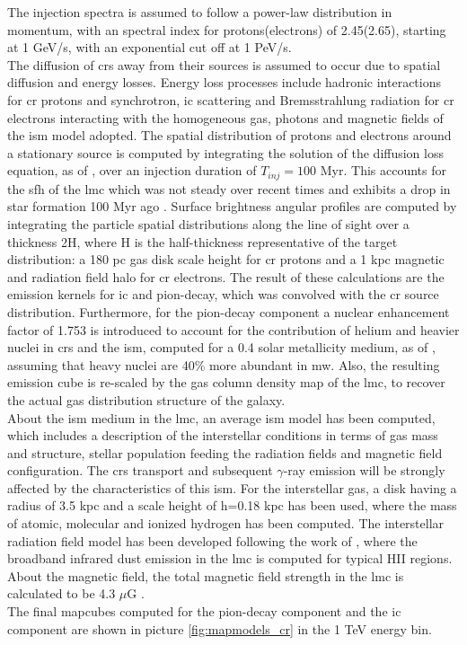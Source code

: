\documentclass[main.tex]{subfiles}
\begin{document}
The injection spectra is assumed to follow a power-law distribution in momentum, with an spectral index for protons(electrons) of 2.45(2.65), starting at 1 GeV/s, with an exponential cut off at 1 PeV/s.\\
The diffusion of \glspl{cr} away from their sources is assumed to occur due to spatial diffusion and energy losses. Energy loss processes include hadronic interactions for \gls{cr} protons and synchrotron, \gls{ic} scattering and Bremsstrahlung radiation for \gls{cr} electrons interacting with the homogeneous gas, photons and magnetic fields of the \gls{ism} model adopted. The spatial distribution of protons and electrons around a stationary source is computed by integrating the solution of the diffusion loss equation, as of \cite{2006diffusionloss}, over an injection duration of $T_{inj} = 100$ Myr. This accounts for the \gls{sfh} of the \gls{lmc} which was not steady over recent times and exhibits a drop in star formation 100 Myr ago \cite{2009SFHofLMC}. Surface brightness angular profiles are computed by integrating the particle spatial distributions along the line of sight over a thickness 2H, where H is the half-thickness representative of the target distribution: a 180 pc gas disk scale height for \gls{cr} protons and a 1 kpc magnetic and radiation field halo for \gls{cr} electrons. The result of these calculations are the emission kernels for \gls{ic} and pion-decay, which was convolved with the \gls{cr} source distribution. Furthermore, for the pion-decay component a nuclear enhancement factor of 1.753 is introduced to account for the contribution of helium and heavier nuclei in \glspl{cr} and the \gls{ism}, computed for a 0.4 solar metallicity medium, as of \cite{2009nuclearenahncement}, assuming that heavy nuclei are 40\% more abundant in \gls{mw}. Also, the resulting emission cube is re-scaled by the gas column density map of the \gls{lmc}, to recover the actual gas distribution structure of the galaxy.\\
About the \gls{ism} medium in the \gls{lmc}, an average \gls{ism} model has been computed, which includes a description of the interstellar conditions in terms of gas mass and structure, stellar population feeding the radiation fields and magnetic field configuration. The \glspl{cr} transport and subsequent $\gamma$-ray emission will be strongly affected by the characteristics of this \gls{ism}. For the interstellar gas, a disk having a radius of 3.5 kpc and a scale height of h=0.18 kpc has been used, where the mass of atomic, molecular and ionized hydrogen has been computed. The interstellar radiation field model has been developed following the work of \cite{2014DustEMLMCismemission}, where the broadband infrared dust emission in the \gls{lmc} is computed for typical HII regions. About the magnetic field, the total magnetic field strength in the \gls{lmc} is calculated to be 4.3 $\mu$G \cite{2005LMCmagneticfield}.\\
The final mapcubes computed for the pion-decay component and the \gls{ic} component are shown in picture \ref{fig:mapmodels_cr} in the 1 TeV energy bin.
\end{document}
